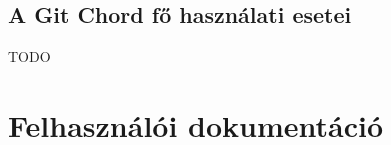 \documentclass[
]{elteikthesis}[2025/03/25]
\begin{document}
\section{A Git Chord fő használati esetei}

TODO



\cleardoublepage

\chapter{Felhasználói dokumentáció}
\end{document}

